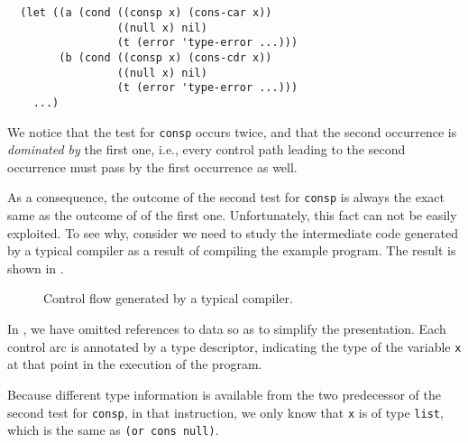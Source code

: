 \begin{verbatim}
  (let ((a (cond ((consp x) (cons-car x))
                 ((null x) nil)
                 (t (error 'type-error ...)))
        (b (cond ((consp x) (cons-cdr x))
                 ((null x) nil)
                 (t (error 'type-error ...)))
    ...)
\end{verbatim}

We notice that the test for \texttt{consp} occurs twice, and that the
second occurrence is \emph{dominated by} the first one, i.e., every
control path leading to the second occurrence must pass by the first
occurrence as well.

As a consequence, the outcome of the second test for \texttt{consp} is
always the exact same as the outcome of of the first one.
Unfortunately, this fact can not be easily exploited.  To see why,
consider we need to study the intermediate code generated by a
typical compiler as a result of compiling the example program.  The
result is shown in .

\begin{figure}
\begin{center}
\end{center}
\caption{\label{fig-example-naive}
Control flow generated by a typical compiler.}
\end{figure}

In , we have omitted references to data so
as to simplify the presentation.  Each control arc is annotated by a
type descriptor, indicating the type of the variable \texttt{x} at
that point in the execution of the program.

Because different type information is available from the two
predecessor of the second test for \texttt{consp}, in that
instruction, we only know that \texttt{x} is of type \texttt{list},
which is the same as \texttt{(or cons null)}.
